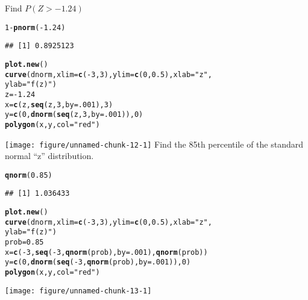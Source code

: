 \documentclass{article}\usepackage[]{graphicx}\usepackage[]{xcolor}
\makeatletter
\def\maxwidth{ %
  \ifdim\Gin@nat@width>\linewidth
    \linewidth
  \else
    \Gin@nat@width
  \fi
}
\newcommand{\hlnum}[1]{\textcolor[rgb]{0.686,0.059,0.569}{#1}}%
\newcommand{\hlsng}[1]{\textcolor[rgb]{0.192,0.494,0.8}{#1}}%
\newcommand{\hlopt}[1]{\textcolor[rgb]{0,0,0}{#1}}%
\newcommand{\hldef}[1]{\textcolor[rgb]{0.345,0.345,0.345}{#1}}%
\newcommand{\hlkwb}[1]{\textcolor[rgb]{0.69,0.353,0.396}{#1}}%
\newcommand{\hlkwc}[1]{\textcolor[rgb]{0.333,0.667,0.333}{#1}}%
\newcommand{\hlkwd}[1]{\textcolor[rgb]{0.737,0.353,0.396}{\textbf{#1}}}%
\newenvironment{kframe}{%
 \def\at@end@of@kframe{}%
 \ifinner\ifhmode%
  \def\at@end@of@kframe{\end{minipage}}%
  \begin{minipage}{\columnwidth}%
 \fi\fi%
 \def\FrameCommand##1{\hskip\@totalleftmargin \hskip-\fboxsep
 \colorbox{shadecolor}{##1}\hskip-\fboxsep
     \hskip-\linewidth \hskip-\@totalleftmargin \hskip\columnwidth}%
 \MakeFramed {\advance\hsize-\width
   \@totalleftmargin\z@ \linewidth\hsize
   \@setminipage}}%
 {\par\unskip\endMakeFramed%
 \at@end@of@kframe}
\newenvironment{knitrout}{}{} %
\makeatother
\begin{document}
Find $P(Z>-1.24)$
\begin{knitrout}
\color{fgcolor}\begin{kframe}
\begin{alltt}
\hlnum{1} \hlopt{-} \hlkwd{pnorm}\hldef{(}\hlopt{-}\hlnum{1.24}\hldef{)}
\end{alltt}
\begin{verbatim}
## [1] 0.8925123
\end{verbatim}
\begin{alltt}
\hlkwd{plot.new}\hldef{()}
\hlkwd{curve}\hldef{(dnorm,} \hlkwc{xlim} \hldef{=} \hlkwd{c}\hldef{(}\hlopt{-}\hlnum{3}\hldef{,} \hlnum{3}\hldef{),} \hlkwc{ylim} \hldef{=} \hlkwd{c}\hldef{(}\hlnum{0}\hldef{,} \hlnum{0.5}\hldef{),} \hlkwc{xlab} \hldef{=} \hlsng{"z"}\hldef{,}
      \hlkwc{ylab}\hldef{=}\hlsng{"f(z)"}\hldef{)}
\hldef{z} \hlkwb{=} \hlopt{-}\hlnum{1.24}
\hldef{x} \hlkwb{=} \hlkwd{c}\hldef{(z,} \hlkwd{seq}\hldef{(z,} \hlnum{3}\hldef{,} \hlkwc{by}\hldef{=}\hlnum{.001}\hldef{),} \hlnum{3}\hldef{)}
\hldef{y} \hlkwb{=} \hlkwd{c}\hldef{(}\hlnum{0}\hldef{,} \hlkwd{dnorm}\hldef{(}\hlkwd{seq}\hldef{(z,} \hlnum{3}\hldef{,} \hlkwc{by}\hldef{=}\hlnum{.001}\hldef{)),} \hlnum{0}\hldef{)}
\hlkwd{polygon}\hldef{(x, y,} \hlkwc{col}\hldef{=}\hlsng{"red"}\hldef{)}
\end{alltt}
\end{kframe}
\texttt{[image: figure/unnamed-chunk-12-1]} 
\end{knitrout}
Find the 85th percentile of the standard normal “z” distribution.
\begin{knitrout}
\color{fgcolor}\begin{kframe}
\begin{alltt}
\hlkwd{qnorm}\hldef{(}\hlnum{0.85}\hldef{)}
\end{alltt}
\begin{verbatim}
## [1] 1.036433
\end{verbatim}
\begin{alltt}
\hlkwd{plot.new}\hldef{()}
\hlkwd{curve}\hldef{(dnorm,} \hlkwc{xlim} \hldef{=} \hlkwd{c}\hldef{(}\hlopt{-}\hlnum{3}\hldef{,} \hlnum{3}\hldef{),} \hlkwc{ylim} \hldef{=} \hlkwd{c}\hldef{(}\hlnum{0}\hldef{,} \hlnum{0.5}\hldef{),} \hlkwc{xlab} \hldef{=} \hlsng{"z"}\hldef{,}
      \hlkwc{ylab}\hldef{=}\hlsng{"f(z)"}\hldef{)}
\hldef{prob} \hlkwb{=} \hlnum{0.85}
\hldef{x} \hlkwb{=} \hlkwd{c}\hldef{(}\hlopt{-}\hlnum{3}\hldef{,} \hlkwd{seq}\hldef{(}\hlopt{-}\hlnum{3}\hldef{,} \hlkwd{qnorm}\hldef{(prob),} \hlkwc{by}\hldef{=}\hlnum{.001}\hldef{),} \hlkwd{qnorm}\hldef{(prob))}
\hldef{y} \hlkwb{=} \hlkwd{c}\hldef{(}\hlnum{0}\hldef{,} \hlkwd{dnorm}\hldef{(}\hlkwd{seq}\hldef{(}\hlopt{-}\hlnum{3}\hldef{,} \hlkwd{qnorm}\hldef{(prob),} \hlkwc{by}\hldef{=}\hlnum{.001}\hldef{)),} \hlnum{0}\hldef{)}
\hlkwd{polygon}\hldef{(x, y,} \hlkwc{col}\hldef{=}\hlsng{"red"}\hldef{)}
\end{alltt}
\end{kframe}
\texttt{[image: figure/unnamed-chunk-13-1]} 
\end{knitrout}
\end{document}

